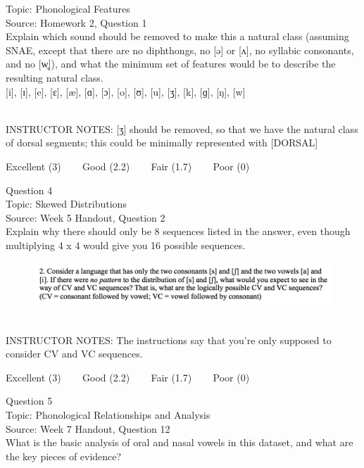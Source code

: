 \documentclass[12pt]{article}
\begin{document}
Topic: Phonological Features\\
Source: Homework 2, Question 1\\

Explain which sound should be removed to make this a natural class (assuming SNAE, except that there are no diphthongs, no [ə] or [ʌ], no syllabic consonants, and no [w̥]), and what the minimum set of features would be to describe the resulting natural class.\\

{[i]}, {[ɪ]}, {[e]}, {[ɛ]}, {[æ]}, {[ɑ]}, {[ɔ]}, {[o]}, {[ʊ]}, {[u]}, {[ʒ]}, {[k]}, {[ɡ]}, {[ŋ]}, {[w]}


~\\
INSTRUCTOR NOTES: [ʒ] should be removed, so that we have the natural class of dorsal segments; this could be minimally represented with [DORSAL]


\vfill
Excellent (3) ~~~ Good (2.2) ~~~ Fair (1.7) ~~~ Poor (0)
\newpage

{\large Question 4}\\

Topic: Skewed Distributions\\
Source: Week 5 Handout, Question 2\\

Explain why there should only be 8 sequences listed in the answer, even though multiplying 4 x 4 would give you 16 possible sequences.\\

\begin{figure}[H]
\includegraphics{../images/skew2.png}
\end{figure}

~\\
INSTRUCTOR NOTES: The instructions say that you're only supposed to consider CV and VC sequences. 


\vfill
Excellent (3) ~~~ Good (2.2) ~~~ Fair (1.7) ~~~ Poor (0)
\newpage

{\large Question 5}\\

Topic: Phonological Relationships and Analysis\\
Source: Week 7 Handout, Question 12\\

What is the basic analysis of oral and nasal vowels in this dataset, and what are the key pieces of evidence?\\
\end{document}
